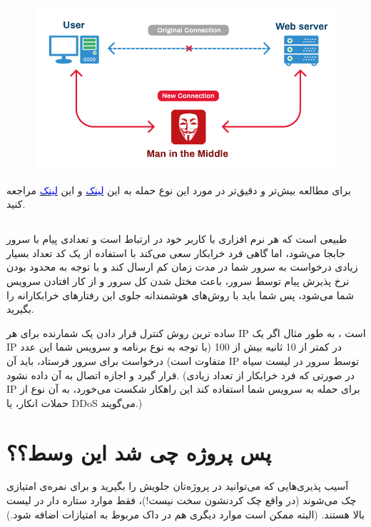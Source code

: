 \documentclass[]{article}
\begin{document}
\begin{figure}
  \includegraphics[width=\linewidth]{images/man-in-the-middle.png}
\end{figure}
\bigskip

برای مطالعه بیش‌تر و دقیق‌تر در مورد این نوع حمله به این \href{https://www.imperva.com/learn/application-security/man-in-the-middle-attack-mitm/}{\textcolor{blue}{لینک}}
 و این \href{https://en.wikipedia.org/wiki/Man-in-the-middle_attack}{\textcolor{blue}{لینک}} مراجعه کنید.





\subsection*{{}}
طبیعی است که هر نرم افزاری با کاربر خود در ارتباط است و تعدادی پیام با سرور جابجا می‌شود، اما گاهی فرد خرابکار سعی می‌کند با استفاده از یک کد تعداد بسیار زیادی درخواست به سرور شما در مدت زمان کم ارسال کند و با توجه به محدود بودن نرخ پذیرش پیام توسط سرور‌، باعث مختل شدن کل سرور و از کار افتادن سرویس شما می‌شود، پس شما باید با روش‌های هوشمندانه جلوی این رفتارهای خرابکارانه را بگیرید.
\bigskip

ساده ترین روش کنترل قرار دادن یک شمارنده برای هر IP است ، به طور مثال اگر یک IP در کمتر از 10 ثانیه بیش از 100 (با توجه به نوع برنامه و سرویس شما این عدد متفاوت است) درخواست برای سرور فرستاد، باید آن IP توسط سرور در لیست سیاه قرار گیرد و اجازه اتصال به آن داده نشود. (در صورتی که فرد خرابکار از تعداد زیادی IP برای حمله به سرویس شما استفاده کند این راهکار شکست می‌خورد، به آن نوع از حملات انکار،  یا DDoS می‌گویند.)

\section*{{\titr پس پروژه چی شد این وسط؟؟}}
آسیب پذیری‌هایی که می‌توانید در پروژه‌تان جلویش را بگیرید و برای نمره‌ی امتیازی چک می‌شوند (در واقع چک کردنشون سخت نیست!‌)، فقط موارد ستاره دار در لیست بالا هستند. (‌البته ممکن است موارد دیگری هم در داک مربوط به امتیازات اضافه شود.)
\end{document}
